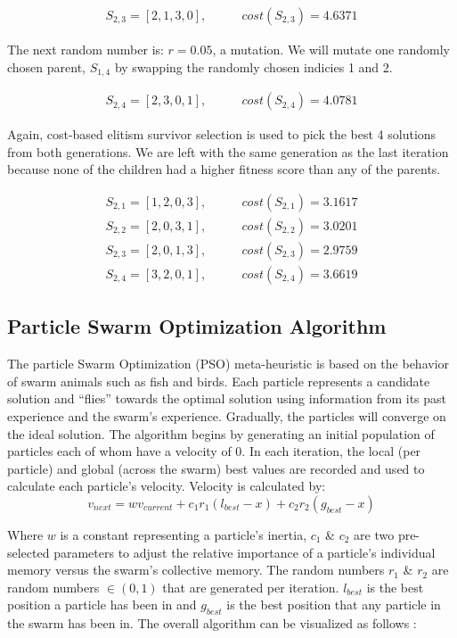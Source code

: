 \documentclass[a4paper]{article}
\begin{document}
\begin{align*}
S_{2,3} = [2, 1, 3, 0], & \qquad cost(S_{2,3}) = 4.6371
\end{align*}

The next random number is: $r=0.05$, a mutation. We will mutate one randomly chosen parent, $S_{1,4}$ by swapping the randomly chosen indicies 1 and 2.

\begin{align*}
S_{2,4} = [2, 3, 0, 1], & \qquad cost(S_{2,4}) = 4.0781
\end{align*}

Again, cost-based elitism survivor selection is used to pick the best 4 solutions from both generations. We are left with the same generation as the last iteration because none of the children had a higher fitness score than any of the parents.

\begin{align*}
S_{2,1} = [1, 2, 0, 3], & \qquad cost(S_{2,1}) = 3.1617 \\
S_{2,2} = [2, 0, 3, 1], & \qquad cost(S_{2,2}) = 3.0201 \\
S_{2,3} = [2, 0, 1, 3], & \qquad cost(S_{2,3}) = 2.9759 \\
S_{2,4} = [3, 2, 0, 1], & \qquad cost(S_{2,4}) = 3.6619
\end{align*}

\subsection{Particle Swarm Optimization Algorithm} %
The particle Swarm Optimization (PSO) meta-heuristic is based on the behavior of swarm animals such as fish and birds.
Each particle represents a candidate solution and ``flies'' towards the optimal solution using information from its
past experience and the swarm's experience. Gradually, the particles will converge on the ideal solution.
The algorithm begins by generating an initial population of particles each of whom have a velocity of 0.
In each iteration, the local (per particle) and global (across the swarm) best values are recorded and used to calculate each particle's velocity. \cite{ClassicalPSO}
Velocity is calculated by:
$$
v_\mathit{next} = wv_\mathit{current} + c_1r_1(l_\mathit{best} - x) + c_2r_2(g_\mathit{best}-x)
$$

Where $w$ is a constant representing a particle's inertia, $c_1$ \& $c_2$ are two pre-selected parameters to adjust the relative importance of a particle's individual memory versus the swarm's collective memory. The random numbers $r_1$ \& $r_2$ are random numbers $\in (0,1)$ that are generated per iteration. $l_\mathit{best}$ is the best position a particle has been in and $g_\mathit{best}$ is the best position that any particle in the swarm has
been in. The overall algorithm can be visualized as follows \cite{PSOFigure}:
\end{document}
